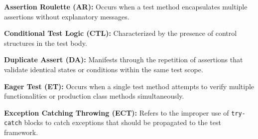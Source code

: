 \documentclass[sigconf]{acmart}
\begin{document}


    \textbf{Assertion Roulette (AR):}
    Occurs when a test method encapsulates multiple assertions without explanatory messages.

    \textbf{Conditional Test Logic (CTL):}
    Characterized by the presence of control structures in the test body.

    \textbf{Duplicate Assert (DA):} 
    Manifests through the repetition of assertions that validate identical states or conditions within the same test scope.

    \textbf{Eager Test (ET):}
    Occurs when a single test method attempts to verify multiple functionalities or production class methods simultaneously.

    \textbf{Exception Catching Throwing (ECT):}
    Refers to the improper use of \texttt{try-catch} blocks to catch exceptions that should be propagated to the test framework.
\end{document}
